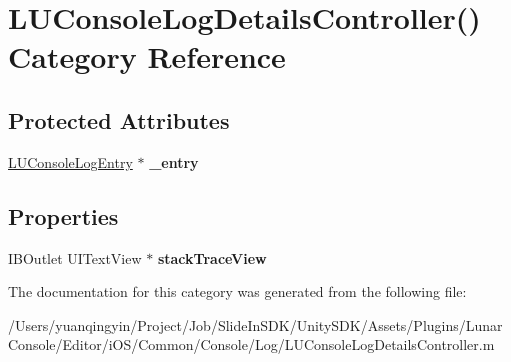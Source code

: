 \hypertarget{category_l_u_console_log_details_controller_07_08}{}\section{L\+U\+Console\+Log\+Details\+Controller() Category Reference}
\label{category_l_u_console_log_details_controller_07_08}
\subsection*{Protected Attributes}
\begin{DoxyCompactItemize}
\item 
\mbox{\label{category_l_u_console_log_details_controller_07_08_aae9527d46240162b8333fb43c3b9c924}} 
\mbox{\hyperlink{interface_l_u_console_log_entry}{L\+U\+Console\+Log\+Entry}} $\ast$ {\bfseries \+\_\+entry}
\end{DoxyCompactItemize}
\subsection*{Properties}
\begin{DoxyCompactItemize}
\item 
\mbox{\label{category_l_u_console_log_details_controller_07_08_a8e25d045fb5a7ca4a6ef46ac8d7aab5c}} 
I\+B\+Outlet U\+I\+Text\+View $\ast$ {\bfseries stack\+Trace\+View}
\end{DoxyCompactItemize}


The documentation for this category was generated from the following file\+:\begin{DoxyCompactItemize}
\item 
/\+Users/yuanqingyin/\+Project/\+Job/\+Slide\+In\+S\+D\+K/\+Unity\+S\+D\+K/\+Assets/\+Plugins/\+Lunar\+Console/\+Editor/i\+O\+S/\+Common/\+Console/\+Log/L\+U\+Console\+Log\+Details\+Controller.\+m\end{DoxyCompactItemize}
